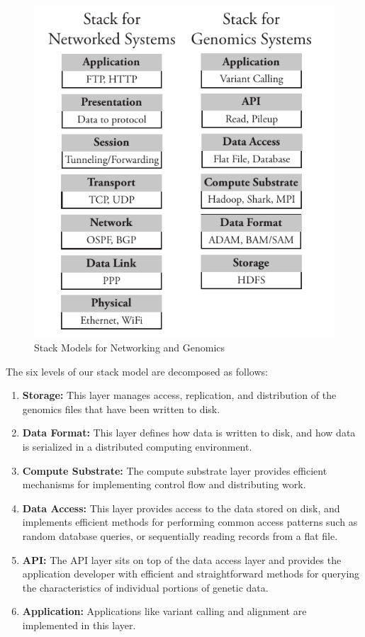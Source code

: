 \documentclass[10pt,twocolumn]{article}
\begin{document}
\begin{figure}[h]
\begin{center}
\includegraphics[width=0.9\linewidth]{stack-model.pdf}
\end{center}
\caption{Stack Models for Networking and Genomics}
\label{fig:stack-model}
\end{figure}

The six levels of our stack model are decomposed as follows:

\begin{enumerate}
\item {\bf Storage:} This layer manages access, replication, and distribution of the genomics files that have been written to disk.
\item {\bf Data Format:} This layer defines how data is written to disk, and how data is serialized in a distributed computing environment.
\item {\bf Compute Substrate:} The compute substrate layer provides efficient mechanisms for implementing control flow and
distributing work.
\item {\bf Data Access:} This layer provides access to the data stored on disk, and implements efficient methods for performing
common access patterns such as random database queries, or sequentially reading records from a flat file. 
\item {\bf API:} The API layer sits on top of the data access layer and provides the application developer with efficient and
straightforward methods for querying the characteristics of individual portions of genetic data. 
\item {\bf Application:} Applications like variant calling and alignment are implemented in this layer.
\end{enumerate}
\end{document}
